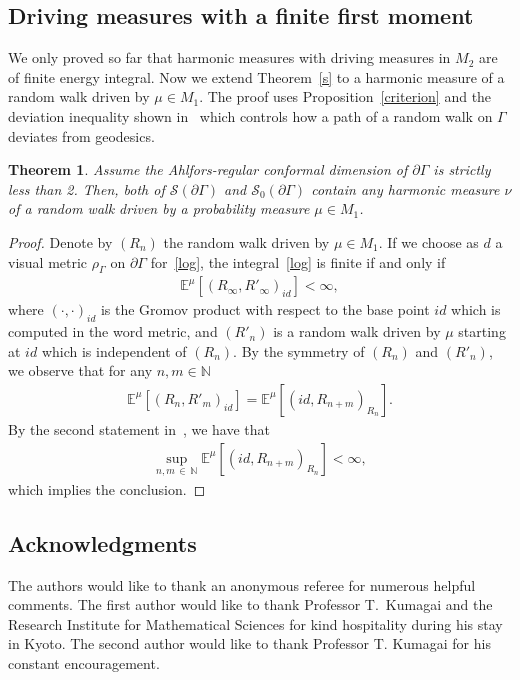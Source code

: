 \documentclass[10pt]{amsart}
\newtheorem{theo}{Theorem}[section]
\theoremstyle{definition}\newtheorem{defi}[theo]{Definition}\newtheorem{rema}[theo]{Remark}\newtheorem{exam}[theo]{Example}\newtheorem{exem}[theo]{Example}\newtheorem{nota}[theo]{Notation}
\newcommand{\cs}{\mathcal{S}}
\newcommand{\bn}{\mathbb{N}}
\newcommand{\be}{\mathbb{E}}
\begin{document}
\subsection{Driving measures with a finite first moment}

We only proved so far that harmonic measures with driving measures in $M_2$ are of finite energy integral. Now we extend Theorem~\ref{s} to a harmonic measure of a random walk driven by $\mu\in M_1$. The proof uses Proposition~\ref{criterion} and the deviation inequality shown in~\cite{MS} which controls how a path of a random walk on $\Gamma$ deviates from geodesics.

\begin{theo}\label{1st}
Assume the Ahlfors-regular conformal dimension of $\partial\Gamma$ is strictly less than 2. Then, both of $\cs(\partial \Gamma)$ and $\cs_0(\partial\Gamma)$ contain any harmonic measure $\nu$ of a random walk driven by a probability measure $\mu\in M_1$.
\end{theo}

\begin{proof}
Denote by $(R_n)$ the random walk driven by $\mu\in M_1$. If we choose as $d$ a visual metric $\rho_{\Gamma}$ on $\partial\Gamma$ for~\eqref{log}, the integral~\eqref{log} is finite if and only if
\begin{align*}
\be^{\mu}\left[(R_{\infty},R'_{\infty})_{id}\right]<\infty,
\end{align*}
where $(\cdot,\cdot)_{id}$ is the Gromov product with respect to the base point $id$ which is computed in the word metric, and $(R'_n)$ is a random walk driven by $\mu$ starting at $id$ which is independent of $(R_n)$. By the symmetry of $(R_n)$ and $(R'_n)$, we observe that for any $n,m\in\bn$
\begin{align*}
\be^{\mu}\left[(R_{n},R'_{m})_{id}\right]=\be^{\mu}\left[(id,R_{n+m})_{R_n}\right].
\end{align*}
By the second statement in~\cite[Theorem~11.1]{MS}, we have that
\begin{align*}
\sup_{n,m\,\in\,\bn}\be^{\mu}\left[(id,R_{n+m})_{R_n}\right]<\infty,
\end{align*}
which implies the conclusion.
\end{proof}

\subsection*{Acknowledgments}
The authors would like to thank an anonymous referee for numerous helpful comments. The first author would like to thank Professor T.~Kumagai and the Research Institute for Mathematical Sciences for kind hospitality during his stay in Kyoto. The second author would like to thank Professor T. Kumagai for his constant encouragement.
\end{document}
